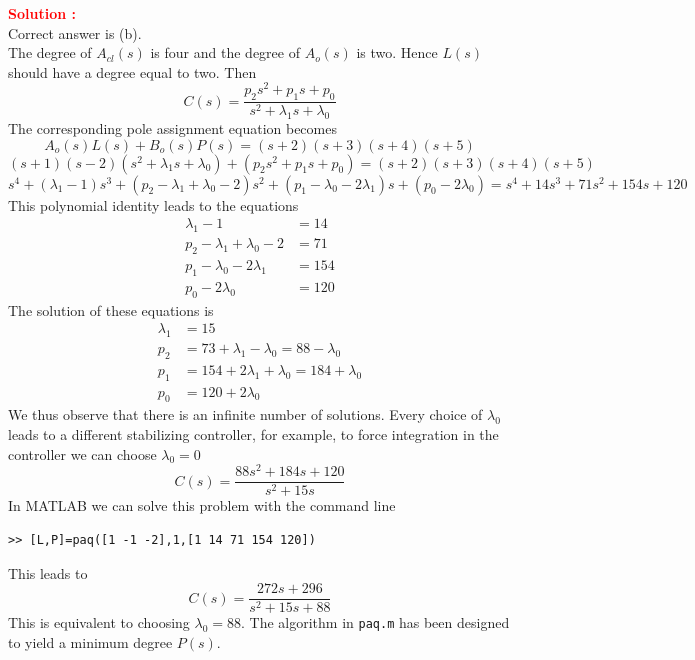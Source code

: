 \documentclass[12pt]{article}
\begin{document}
\textbf{\textcolor{red}{Solution :}} \\ 
Correct answer is (b).\\
The degree of $A_{cl}(s)$ is four and the degree of $A_o(s)$ is two. Hence $L(s)$ should have a degree equal to two. Then
\begin{equation}
C(s) = \frac{p_2s^2 + p_1s + p_0}{s^2 + \lambda_1s + \lambda_0}
\end{equation}
The corresponding pole assignment equation becomes
\begin{equation}
A_o(s)L(s) + B_o(s)P(s) = (s + 2)(s + 3)(s + 4)(s + 5)
\end{equation}
\begin{equation}
(s + 1)(s - 2)(s^2 + \lambda_1s + \lambda_0) + (p_2s^2 + p_1s + p_0) = (s + 2)(s + 3)(s + 4)(s + 5)
\end{equation}
\begin{equation}
s^4 + (\lambda_1 - 1)s^3 + (p_2 - \lambda_1 + \lambda_0 - 2)s^2 + (p_1 - \lambda_0 - 2\lambda_1)s + (p_0 - 2\lambda_0) = s^4 + 14s^3 + 71s^2 + 154s + 120
\end{equation}
This polynomial identity leads to the equations
\begin{align}
\lambda_1 - 1 &= 14 \\
p_2 - \lambda_1 + \lambda_0 - 2 &= 71 \\
p_1 - \lambda_0 - 2\lambda_1 &= 154 \\
p_0 - 2\lambda_0 &= 120
\end{align}
The solution of these equations is
\begin{align}
\lambda_1 &= 15 \\
p_2 &= 73 + \lambda_1 - \lambda_0 = 88 - \lambda_0 \\
p_1 &= 154 + 2\lambda_1 + \lambda_0 = 184 + \lambda_0 \\
p_0 &= 120 + 2\lambda_0
\end{align}
We thus observe that there is an infinite number of solutions. Every choice of $\lambda_0$ leads to a different stabilizing controller, for example, to force integration in the controller we can choose $\lambda_0 = 0$
\begin{equation}
C(s) = \frac{88s^2 + 184s + 120}{s^2 + 15s}
\end{equation}
In MATLAB we can solve this problem with the command line
\begin{verbatim}
>> [L,P]=paq([1 -1 -2],1,[1 14 71 154 120])
\end{verbatim}
This leads to
\begin{equation}
C(s) = \frac{272s + 296}{s^2 + 15s + 88}
\end{equation}
This is equivalent to choosing $\lambda_0 = 88$. The algorithm in \texttt{paq.m} has been designed to yield a minimum degree $P(s)$.
\clearpage
\end{document}
